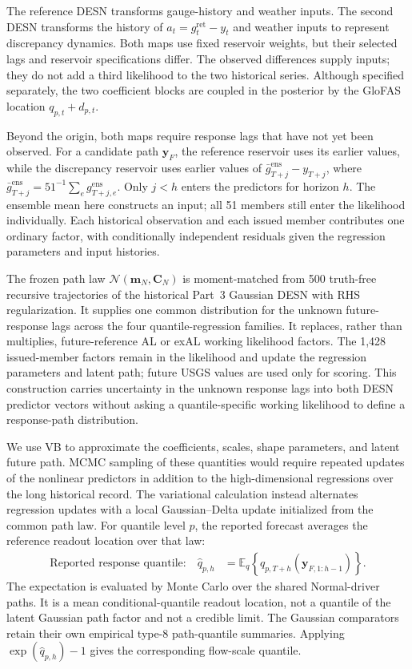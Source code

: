 \documentclass[12pt,letterpaper]{article}
\numberwithin{equation}{section}
\newcommand{\E}{\mathbb{E}}
\newcommand{\Normal}{\mathcal{N}}
\newcommand{\vect}[1]{\bm{#1}}
\newcommand{\mat}[1]{\bm{#1}}
\begin{document}
The reference DESN transforms gauge-history and weather inputs. The second
DESN transforms the history of
\(a_t=g_t^{\mathrm{ret}}-y_t\) and weather inputs to represent discrepancy
dynamics. Both maps use fixed reservoir weights, but their selected lags
and reservoir specifications differ. The observed differences supply inputs;
they do not add a third likelihood to the two historical series.
Although specified separately, the two coefficient blocks are coupled in
the posterior by the GloFAS location \(q_{p,t}+d_{p,t}\).

Beyond the origin, both maps require response lags that have not yet been
observed. For a candidate path \(\vect y_F\), the reference reservoir
uses its earlier values, while the discrepancy reservoir uses earlier
values of \(\bar g_{T+j}^{\mathrm{ens}}-y_{T+j}\), where
\(\bar g_{T+j}^{\mathrm{ens}}=51^{-1}\sum_e g_{T+j,e}^{\mathrm{ens}}\).
Only \(j<h\) enters the predictors for horizon \(h\). The ensemble mean
here constructs an input; all 51 members still enter the likelihood
individually. Each historical observation and each issued member contributes
one ordinary factor, with conditionally independent residuals given the
regression parameters and input histories.

The frozen path law \(\Normal(\vect m_N,\mat C_N)\) is moment-matched from
500 truth-free recursive trajectories of the historical Part~3 Gaussian
DESN with RHS regularization. It supplies one common distribution for the
unknown future-response lags across the four quantile-regression families.
It replaces, rather than multiplies, future-reference AL or exAL working
likelihood factors. The 1,428 issued-member factors remain in the likelihood
and update the regression parameters and latent path; future USGS values are
used only for scoring. This construction carries uncertainty in the unknown
response lags into both DESN predictor vectors without asking a
quantile-specific working likelihood to define a response-path distribution.

We use VB to approximate the coefficients, scales, shape parameters, and
latent future path. MCMC sampling of these quantities would require repeated
updates of the nonlinear predictors in addition to the high-dimensional
regressions over the long historical record. The variational calculation
instead alternates regression updates with a local Gaussian--Delta update
initialized from the common path law. For quantile level \(p\), the reported
forecast averages the reference readout location over that law:
\begin{equation}
\begin{aligned}
\text{Reported response quantile:}\quad
\widehat q_{p,h}
&=\E_q\!\left\{q_{p,T+h}(\vect y_{F,1:h-1})\right\}.
\end{aligned}
\label{eq:glofas-reference-forecast-main}
\end{equation}
The expectation is evaluated by Monte Carlo over the shared Normal-driver
paths. It is a mean conditional-quantile readout location, not a quantile of
the latent Gaussian path factor and not a credible limit. The Gaussian
comparators retain their own empirical type-8 path-quantile summaries.
Applying \(\exp(\widehat q_{p,h})-1\) gives the corresponding flow-scale
quantile.
\end{document}
